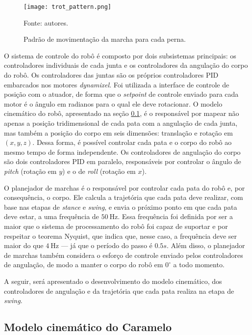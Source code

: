 \documentclass[conference]{IEEEtran}
\begin{document}
\begin{figure}[htbp]
  \centering
  \texttt{[image: trot\_pattern.png]}
  \vfill
  \caption{Padrão de movimentação da marcha para cada perna.}
  Fonte: autores.
  \label{fig:trot_pattern}
\end{figure}

O sistema de controle do robô é composto por dois subsistemas principais: os controladores individuais de cada junta e os controladores da angulação do corpo do robô. Os controladores das juntas são os próprios controladores PID embarcados nos motores \textit{dynamixel}. Foi utilizada a interface de controle de posição com o atuador, de forma que o \textit{setpoint} de controle enviado para cada motor é o ângulo em radianos para o qual ele deve rotacionar. O modelo cinemático do robô, apresentado na seção \ref{sec:detail_inv_kinematics}, é o responsável por mapear não apenas a posição tridimensional de cada pata com a angulação de cada junta, mas também a posição do corpo em seis dimensões: translação e rotação em $(x, y, z)$. Dessa forma, é possível controlar cada pata e o corpo do robô ao mesmo tempo de forma independente. Os controladores de angulação do corpo são dois controladores PID em paralelo, responsáveis por controlar o ângulo de \textit{pitch} (rotação em $y$) e o de \textit{roll} (rotação em $x$).

O planejador de marchas é o responsável por controlar cada pata do robô e, por consequência, o corpo. Ele calcula a trajetória que cada pata deve realizar, com base nas etapas de \textit{stance} e \textit{swing}, e envia o próximo ponto em que cada pata deve estar, a uma frequência de $\SI{50}{\hertz}$. Essa frequência foi definida por ser a maior que o sistema de processamento do robô foi capaz de suportar e por respeitar o teorema Nyquist, que indica que, nesse caso, a frequência deve ser maior do que $\SI{4}{\hertz}$ --- já que o período do passo é $0.5 s$. Além disso, o planejador de marchas também considera o esforço de controle enviado pelos controladores de angulação, de modo a manter o corpo do robô em $0^{\circ}$ a todo momento.

A seguir, será apresentado o desenvolvimento do modelo cinemático, dos controladores de angulação e da trajetória que cada pata realiza na etapa de \textit{swing}.

\subsection{Modelo cinemático do Caramelo}
\label{sec:detail_inv_kinematics}
\end{document}
